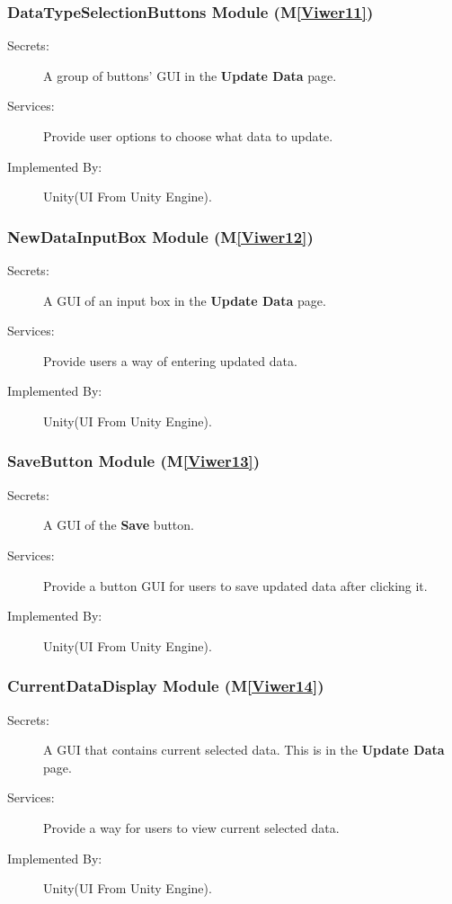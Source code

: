 \documentclass[12pt, titlepage]{article}
\newcommand{\mref}[1]{M\ref{#1}}
\newcommand{\UUI}{Unity(UI From Unity Engine).}
\begin{document}
\subsubsection{DataTypeSelectionButtons Module (\mref{Viwer11})}
\begin{description}
\item[Secrets:] A group of buttons' GUI in the \textbf{Update Data} page.
\item[Services:] Provide user options to choose what data to update.
\item[Implemented By:] \UUI
\end{description}

\subsubsection{NewDataInputBox Module (\mref{Viwer12})}
\begin{description}
\item[Secrets:] A GUI of an input box in the \textbf{Update Data} page.
\item[Services:] Provide users a way of entering updated data.
\item[Implemented By:] \UUI
\end{description}

\renewcommand\bt{\textbf{Save }}
\subsubsection{SaveButton Module (\mref{Viwer13})}
\begin{description}
\item[Secrets:] A GUI of the \bt button.
\item[Services:] Provide a button GUI for users to save updated data after 
clicking it.
\item[Implemented By:]\UUI
\end{description}

\subsubsection{CurrentDataDisplay Module (\mref{Viwer14})}
\begin{description}
\item[Secrets:] A GUI that contains current selected data. This is in the \textbf{Update Data}
 page.
\item[Services:] Provide a way for users to view current selected data. 
\item[Implemented By:] \UUI
\end{description}
\end{document}
